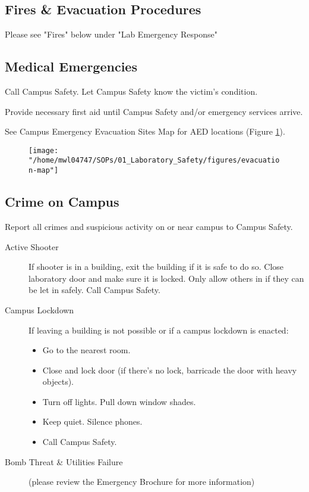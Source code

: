 \documentclass[12pt]{../SOP4_alpha}\usepackage[]{graphicx}\usepackage[]{xcolor}
\begin{document}
\subsection*{Fires \& Evacuation Procedures}

Please see "Fires" below under "Lab Emergency Response"

\subsection{Medical Emergencies}

\NP Call Campus Safety. Let Campus Safety know the victim's condition. 

\NP Provide necessary first aid until Campus Safety and/or emergency services arrive.

\NP See Campus Emergency Evacuation Sites Map for AED locations (Figure \ref{fig:evacmap}).


\begin{figure}
\label{fig:evacmap}
\texttt{[image: "/home/mwl04747/SOPs/01\_Laboratory\_Safety/figures/evacuation-map"]}
\end{figure}

\subsection*{Crime on Campus}

\NP Report all crimes and suspicious activity on or near campus to Campus Safety.

\begin{description}
  \item[Active Shooter]If shooter is in a building, exit the building if it is safe to do so. Close laboratory door and make sure it is locked. Only allow others in if they can be let in safely. Call Campus Safety.
  \item[Campus Lockdown] If leaving a building is not possible or if a campus lockdown is enacted:
\begin{itemize}
  \item Go to the nearest room.
  \item Close and lock door (if there’s no lock, barricade the door with heavy objects).
  \item Turn off lights. Pull down window shades.
  \item Keep quiet. Silence phones.
  \item Call Campus Safety.
\end{itemize}
  \item[Bomb Threat \& Utilities Failure](please review the Emergency Brochure for more information)
\end{description}
\end{document}
